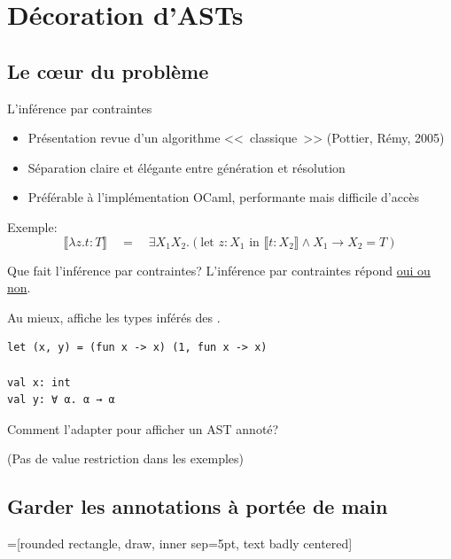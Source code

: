 \documentclass[final]{beamer}
\newcommand{\red}[1]{\textcolor[HTML]{F7800A}{#1}}
\begin{document}
\section{Décoration d'ASTs}

\subsection{Le cœur du problème}

\begin{frame}{L'inférence par contraintes}
  \begin{itemize}
    \item Présentation revue d'un algorithme <<~classique~>> (Pottier, Rémy, 2005)
    \item Séparation claire et élégante entre génération et résolution
    \item Préférable à l'implémentation OCaml, performante mais difficile
      d'accès
  \end{itemize}
  Exemple: $$
  \llbracket \lambda z.t : T \rrbracket \quad = \quad
  \exists X_1 X_2.\left(\text{let }z: X_1 \text{ in } \llbracket t: X_2
  \rrbracket \wedge X_1 \to X_2 = T\right)
  $$
\end{frame}

\begin{frame}[fragile]{Que fait l'inférence par contraintes?}
  L'inférence par contraintes répond \underline{oui ou non}.

  Au mieux, affiche les types inférés des \underline{}.
  \begin{verbatim}
let (x, y) = (fun x -> x) (1, fun x -> x)

val x: int
val y: ∀ α. α → α
  \end{verbatim}

  \red{Comment l'adapter pour afficher un AST annoté?}

  \begin{flushright}
    \footnotesize(Pas de value restriction dans les exemples)
  \end{flushright}
\end{frame}

\subsection{Garder les annotations à portée de main}

=[rounded rectangle, draw,
        inner sep=5pt,
        text badly centered]
\end{document}

